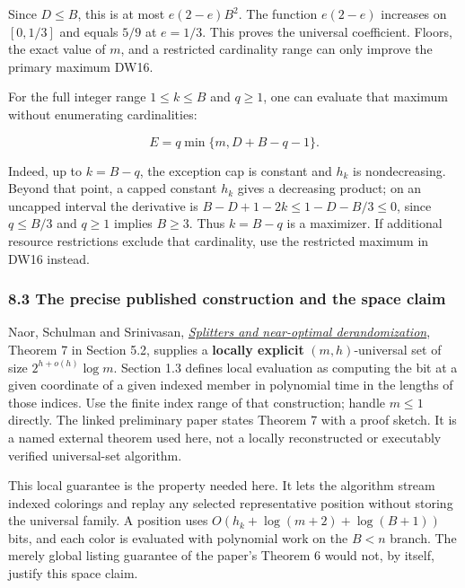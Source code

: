 Since \(D\le B\), this is at most \(e(2-e)B^2\). The function \(e(2-e)\) increases on \([0,1/3]\) and equals \(5/9\) at \(e=1/3\). This proves the universal coefficient. Floors, the exact value of \(m\), and a restricted cardinality range can only improve the primary maximum DW16.

For the full integer range \(1\le k\le B\) and \(q\ge1\), one can evaluate that maximum without enumerating cardinalities:

\[
E=q\min\{m,D+B-q-1\}.
\tag{DW20}
\]

Indeed, up to \(k=B-q\), the exception cap is constant and \(h_k\) is nondecreasing. Beyond that point, a capped constant \(h_k\) gives a decreasing product; on an uncapped interval the derivative is \(B-D+1-2k\le1-D-B/3\le0\), since \(q\le B/3\) and \(q\ge1\) implies \(B\ge3\). Thus \(k=B-q\) is a maximizer. If additional resource restrictions exclude that cardinality, use the restricted maximum in DW16 instead.

\hypertarget{af-fe230a140d-the-precise-published-construction-and-the-space-claim}{%
\subsubsection{8.3 The precise published construction and the space claim}\label{af-fe230a140d-the-precise-published-construction-and-the-space-claim}}

Naor, Schulman and Srinivasan, \href{https://www.wisdom.weizmann.ac.il/~naor/PAPERS/splitters.pdf}{\emph{Splitters and near-optimal derandomization}}, Theorem 7 in Section 5.2, supplies a \textbf{locally explicit} \((m,h)\)-universal set of size \(2^{h+o(h)}\log m\). Section 1.3 defines local evaluation as computing the bit at a given coordinate of a given indexed member in polynomial time in the lengths of those indices. Use the finite index range of that construction; handle \(m\le1\) directly. The linked preliminary paper states Theorem 7 with a proof sketch. It is a named external theorem used here, not a locally reconstructed or executably verified universal-set algorithm.

This local guarantee is the property needed here. It lets the algorithm stream indexed colorings and replay any selected representative position without storing the universal family. A position uses \(O(h_k+\log(m+2)+\log(B+1))\) bits, and each color is evaluated with polynomial work on the \(B<n\) branch. The merely global listing guarantee of the paper's Theorem 6 would not, by itself, justify this space claim.

